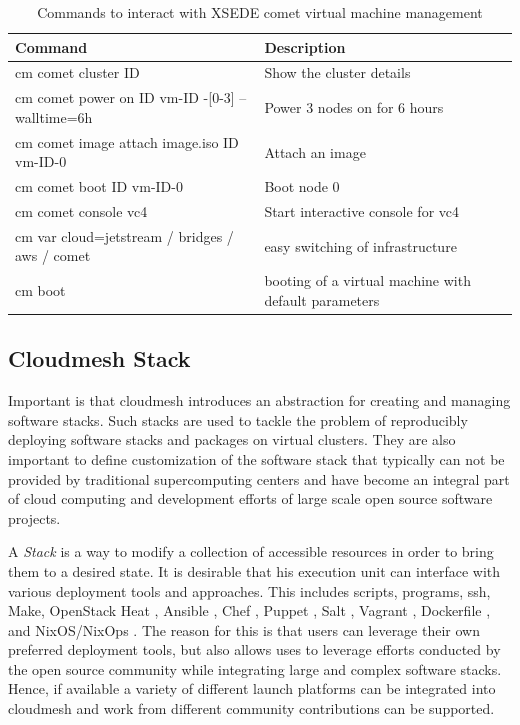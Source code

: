 
\begin{table}[htb]
\caption{Commands to interact with XSEDE comet virtual machine
  management}\label{T:comet}
\begin{center}
\begin{tabular}{|l|l|}
\hline
Command & Description\\
\hline
\hline
cm comet cluster  ID
  &  Show the cluster details \\
cm comet power on ID vm-ID -[0-3] --walltime=6h
  & Power 3 nodes on for 6 hours \\
cm comet image attach image.iso ID vm-ID-0
  &  Attach an image \\
cm comet boot ID vm-ID-0
  & Boot node 0 \\
cm comet console vc4
  & Start interactive console for vc4  \\
cm var cloud=jetstream / bridges / aws / comet
   & easy switching of infrastructure \\
cm boot
   & booting of a virtual machine with default parameters\\
\hline
\end{tabular}
\end{center}
\end{table}




\subsection{Cloudmesh Stack} 
\label{S:stacks}

Important is that cloudmesh introduces an abstraction for creating and
managing software stacks. Such stacks are used to tackle the problem
of reproducibly deploying software stacks and packages on virtual
clusters. They are also important to define customization of the
software stack that typically can not be provided by traditional
supercomputing centers and have become an integral part of cloud
computing and development efforts of large scale open source software
projects.

A {\it Stack} is a way to modify a collection of accessible resources
in order to bring them to a desired state. It is desirable that his
execution unit can interface with various deployment tools and
approaches. This includes scripts, programs, ssh, Make, OpenStack Heat
\cite{??}, Ansible \cite{??}, Chef \cite{??}, Puppet \cite{??}, Salt
\cite{??}, Vagrant \cite{??}, Dockerfile \cite{??}, and NixOS/NixOps
\cite{??}. The reason for this is that users can leverage their own
preferred deployment tools, but also allows uses to leverage efforts
conducted by the open source community while integrating large and
complex software stacks.  Hence, if available a variety of different
launch platforms can be integrated into cloudmesh and work from
different community contributions can be supported.

